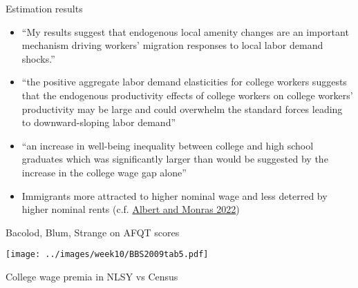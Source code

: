 \documentclass[11pt,notes=hide,aspectratio=169]{beamer}
\begin{document}
\begin{frame}{Estimation results}
\begin{itemize}
	\item ``My results suggest that endogenous local amenity changes are an important mechanism driving workers' migration responses to local labor demand shocks.''
	\item ``the positive aggregate labor demand elasticities for college workers suggests that the endogenous productivity effects of college workers on college workers' productivity may be large and could overwhelm the standard forces leading to downward-sloping labor demand''
	\item ``an increase in well-being inequality between college and high school graduates which was significantly larger than would be suggested by the increase in the college wage gap alone''
	\item Immigrants more attracted to higher nominal wage and less deterred by higher nominal rents (c.f. \href{https://www.aeaweb.org/articles?id=10.1257/aer.20211241}{Albert and Monras 2022})
\end{itemize}
\end{frame}
\begin{frame}{Bacolod, Blum, Strange on AFQT scores}
\hypertarget{BBS2009tab5}{}
\begin{center}\texttt{[image: ../images/week10/BBS2009tab5.pdf]}\end{center}
\vspace{-5mm}
\hyperlink{NLSY_main}{\beamerreturnbutton}
\end{frame}
\begin{frame}{College wage premia in NLSY vs Census}
\hypertarget{BSPvsCensus}{}

\hyperlink{NLSY_main}{\beamerreturnbutton}
\end{frame}
\end{document}
